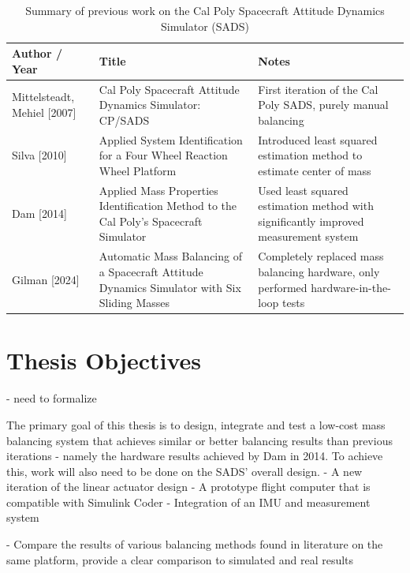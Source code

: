 \begin{table}[h!]
\caption{Summary of previous work on the Cal Poly Spacecraft Attitude Dynamics Simulator (SADS)}
\label{table:sads_history}
\centering
\renewcommand{\arraystretch}{1.4} %

\begin{tabularx}{\textwidth}{
    >{\raggedright\arraybackslash}p{4cm}   %
    >{\raggedright\arraybackslash}p{5cm}   %
    >{\raggedright\arraybackslash}X}       %
\hline
\textbf{Author / Year} & \textbf{Title} & \textbf{Notes} \\
\hline
Mittelsteadt, Mehiel [2007] & 
Cal Poly Spacecraft Attitude Dynamics Simulator: CP/SADS & 
First iteration of the Cal Poly SADS, purely manual balancing \\[2.0em]

Silva [2010] & 
Applied System Identification for a Four Wheel Reaction Wheel Platform & 
Introduced least squared estimation method to estimate center of mass \\[2.0em]

Dam [2014] & 
Applied Mass Properties Identification Method to the Cal Poly's Spacecraft Simulator & 
Used least squared estimation method with significantly improved measurement system \\[2.0em]

Gilman [2024] & 
Automatic Mass Balancing of a Spacecraft Attitude Dynamics Simulator with Six Sliding Masses & 
Completely replaced mass balancing hardware, only performed hardware-in-the-loop tests \\
\hline
\end{tabularx}
\end{table}

\section{Thesis Objectives} - need to formalize

The primary goal of this thesis is to design, integrate and test a low-cost mass balancing system that achieves similar or better balancing results than previous iterations - namely the hardware results achieved by Dam in 2014. To achieve this, work will also need to be done on the SADS' overall design.
- A new iteration of the linear actuator design
- A prototype flight computer that is compatible with Simulink Coder
- Integration of an IMU and measurement system

- Compare the results of various balancing methods found in literature on the same platform, provide a clear comparison to simulated and real results


